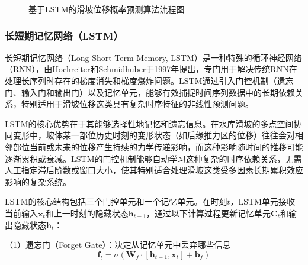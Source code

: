 \documentclass[12pt,a4paper]{article}
\newcommand{\figcaption}[2]{%
  \caption[#1]{{\CJKfamily{songbold}#1}}}
\begin{document}
\begin{figure}[H]
\figcaption{基于LSTM的滑坡位移概率预测算法流程图}{Algorithm Flowchart of Probabilistic Landslide Displacement Prediction Based on LSTM}
\label{fig:lstm_algorithm_flowchart}
\end{figure}

\subsubsection{长短期记忆网络（LSTM）}

长短期记忆网络（Long Short-Term Memory, LSTM）是一种特殊的循环神经网络（RNN），由Hochreiter和Schmidhuber于1997年提出，专门用于解决传统RNN在处理长序列时存在的梯度消失和梯度爆炸问题。LSTM通过引入门控机制（遗忘门、输入门和输出门）以及记忆单元，能够有效捕捉时间序列数据中的长期依赖关系，特别适用于滑坡位移这类具有复杂时序特征的非线性预测问题。

LSTM的核心优势在于其能够选择性地记忆和遗忘信息。在水库滑坡的多点空间协同变形中，坡体某一部位历史时刻的变形状态（如后缘推力区的位移）往往会对相邻部位当前或未来的位移产生持续的力学传递影响，而这种影响随时间的推移可能逐渐累积或衰减。LSTM的门控机制能够自动学习这种复杂的时序依赖关系，无需人工指定滞后阶数或窗口大小，使其特别适合处理滑坡这类受多因素长期累积效应影响的复杂系统。

LSTM的核心结构包括三个门控单元和一个记忆单元。在时刻$t$，LSTM单元接收当前输入$\mathbf{x}_t$和上一时刻的隐藏状态$\mathbf{h}_{t-1}$，通过以下计算过程更新记忆单元$\mathbf{C}_t$和输出隐藏状态$\mathbf{h}_t$：

（1）遗忘门（Forget Gate）：决定从记忆单元中丢弃哪些信息
\begin{equation}
\mathbf{f}_t = \sigma(\mathbf{W}_f \cdot [\mathbf{h}_{t-1}, \mathbf{x}_t] + \mathbf{b}_f)
\label{eq:forget-gate}
\end{equation}
\end{document}
